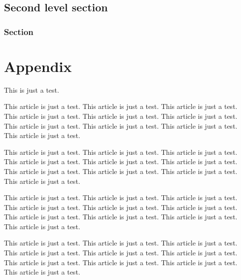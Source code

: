 \documentclass[pdftex,english,a4paper,10pt,twocolumn]{infocom}
\begin{document}
\subsection{Second level section}
\label{id2719533}\hypertarget{id2719533}{}%

\subsubsection{Section}
\label{id2719540}\hypertarget{id2719540}{}%

\newcommand{\dbappendix}[1]{\section{#1}}%
\appendix

\dbappendix{Appendix}
\label{id2719555}\hypertarget{id2719555}{}%

This is just a test.

This article is just a test. This article is just a test.
This article is just a test. This article is just a test. 
This article is just a test. This article is just a test. 
This article is just a test. This article is just a test. 
This article is just a test. This article is just a test. 


This article is just a test. This article is just a test.
This article is just a test. This article is just a test. 
This article is just a test. This article is just a test. 
This article is just a test. This article is just a test. 
This article is just a test. This article is just a test. 


This article is just a test. This article is just a test.
This article is just a test. This article is just a test. 
This article is just a test. This article is just a test. 
This article is just a test. This article is just a test. 
This article is just a test. This article is just a test. 


This article is just a test. This article is just a test.
This article is just a test. This article is just a test. 
This article is just a test. This article is just a test. 
This article is just a test. This article is just a test. 
This article is just a test. This article is just a test. 
\end{document}
